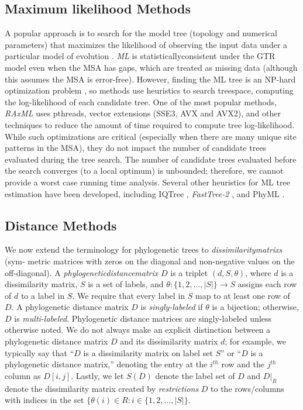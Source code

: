 \subsection{Maximum likelihood Methods} 
A popular approach is to search for the model tree (topology and numerical parameters) that maximizes the likelihood of observing the input data under a particular model of evolution \cite{felsenstein1981evolutionary}.
\textit{\Gls{ML}} is \gls{statisticallyconsistent} under the \gls{GTR} model even when the \gls{MSA} has \glspl{gap}, which are treated as missing data \cite{truszkowski2016maximum} (although this assumes the MSA is error-free).
However, finding the ML tree is an NP-hard optimization problem \cite{roch2006short}, so methods use heuristics to search \gls{treespace}, computing the log-likelihood of each candidate tree.
One of the most popular methods, \textit{\gls{RAxML}} \cite{stamatakis2014raxml8} uses pthreads, vector extensions (SSE3, AVX and AVX2), and other techniques to reduce the amount of time required to compute tree log-likelihood.
While such optimizations are critical (especially when there are many unique site patterns in the MSA), they do not impact the number of candidate trees evaluated during the tree search.
The number of candidate trees evaluated before the search converges (to a local optimum) is unbounded; therefore, we cannot provide a worst case running time analysis.
Several other heuristics for ML tree estimation have been developed, including IQTree \cite{nguyen2015iqtree}, \textit{\gls{FastTree-2}}  \cite{price2010fasttree2}, and PhyML \cite{guindon2010new}.

\subsection{Distance Methods}
We now extend the terminology for phylogenetic trees to \textit{\glspl{dissimilaritymatrix}} (sym-
\clearpage
\noindent 
metric matrices with zeros on the diagonal and non-negative values on the off-diagonal).
A \textit{\gls{phylogeneticdistancematrix}} $D$ is a triplet $(d, S, \theta)$, where $d$ is a dissimilarity matrix, $S$ is a set of labels, and $\theta : \{1, 2, \dots, |S| \} \rightarrow S$ assigns each row of $d$ to a label in $S$.
We require that every label in $S$ map to at least one row of $D$.
A phylogenetic distance matrix $D$ is \textit{\gls{singly-labeled}} if $\theta$ is a bijection; otherwise, $D$ is \textit{\gls{multi-labeled}}.
Phylogenetic distance matrices are singly-labeled unless otherwise noted.
We do not always make an explicit distinction between a phylogenetic distance matrix $D$ and its dissimilarity matrix $d$; for example, we typically say that ``$D$ is a dissimilarity matrix on label set $S$'' or ``$D$ is a phylogenetic distance matrix,'' denoting the entry at the $i^{th}$ row and the $j^{th}$ column as $D[i,j]$. 
Lastly, we let $S(D)$ denote the label set of $D$ and $D|_R$ denote the dissimilarity matrix created by \textit{\glspl{restriction}} $D$ to the rows/columns with indices in the set $\{ \theta(i) \in R : i \in \{1, 2, \dots, |S| \}$.

